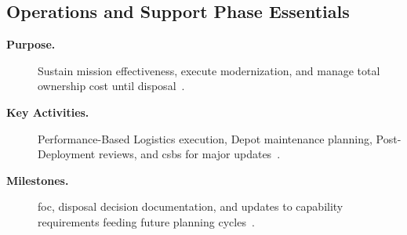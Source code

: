 \documentclass[../main.tex]{subfiles}
\begin{document}
\subsection{Operations and Support Phase Essentials}
\begin{description}
	\item[\textbf{Purpose.}] Sustain mission effectiveness, execute modernization, and manage total ownership cost until disposal~\autocite{DoDI5000-85}.
	\item[\textbf{Key Activities.}] Performance-Based Logistics execution, Depot maintenance planning, Post-Deployment reviews, and \acp{csb} for major updates~\autocite{DoDI5000-85}.
	\item[\textbf{Milestones.}] \ac{foc}, disposal decision documentation, and updates to capability requirements feeding future planning cycles~\autocite{DoDI5000-85}.
\end{description}

\end{document}
